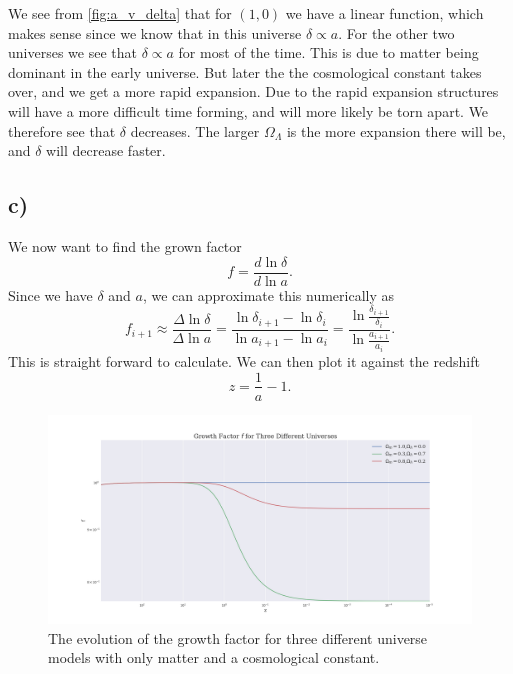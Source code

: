 \documentclass[a4paper,norsk, 10pt]{article}
\begin{document}
We see from \ref{fig:a_v_delta} that for $(1,0)$ we have a linear function, which makes sense since we know that in this universe $\delta \propto a$. For the other two universes we see that $\delta \propto a$ for most of the time. This is due to matter being dominant in the early universe. But later the the cosmological constant takes over, and we get a more rapid expansion. Due to the rapid expansion structures will have a more difficult time forming, and will more likely be torn apart. We therefore see that $\delta$ decreases. The larger $\Omega_{\Lambda}$ is the more expansion there will be, and $\delta$ will decrease faster.

\subsection{c)}
We now want to find the grown factor 
\begin{equation}\label{eq:f}
f = \frac{d\ln \delta}{d\ln a}.
\end{equation}
Since we have $\delta$ and $a$, we can approximate this numerically as
\begin{equation}
f_{i+1} \approx \frac{\Delta \ln \delta}{\Delta \ln a} = \frac{\ln \delta_{i+1} - \ln \delta_{i}}{\ln a_{i+1} - \ln a_{i}} = \frac{\ln \frac{\delta_{i+1}}{\delta_{i}}}{\ln \frac{a_{i+1}}{a_{i}}}.
\end{equation}
This is straight forward to calculate. We can then plot it against the redshift
\begin{equation}
z = \frac{1}{a} - 1.
\end{equation}

\begin{figure}[!h]
\centering
\includegraphics[scale=0.25]{z_v_f}
\caption{The evolution of the growth factor for three different universe models with only matter and a cosmological constant.}\label{fig:z_v_f}
\end{figure}
\end{document}
